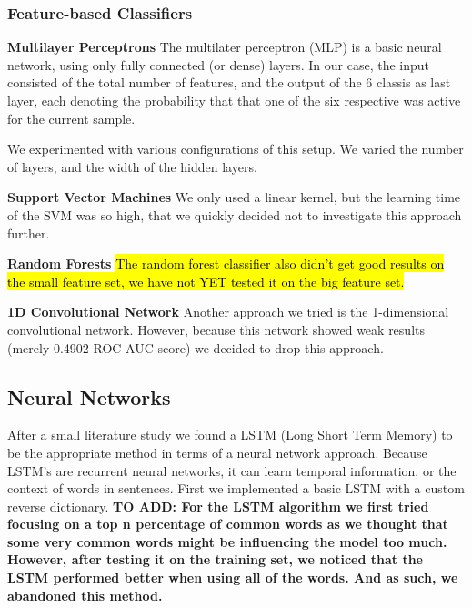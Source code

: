 \documentclass[10pt, a4paper]{article}
\begin{document}
\begin{multicols}{2}
		\subsubsection{Feature-based Classifiers}
		\label{sec:classifiers}
		\textbf{Multilayer Perceptrons}
		The multilater perceptron (MLP) is a basic neural network, using only fully connected (or dense) layers. In our case, the input consisted of the total number of features, and the output of the 6 classis as last layer, each denoting the probability that that one of the six respective was active for the current sample. 
		
		We experimented with various configurations of this setup. We varied the number of layers, and the width of the hidden layers.
		
		
		\textbf{Support Vector Machines}
		We only used a linear kernel, but the learning time of the SVM was so high, that we quickly decided not to investigate this approach further.
		
		\textbf{Random Forests}
		\hl{The random forest classifier also didn't get good results on the small feature set, we have not YET tested it on the big feature set.}
		
		\textbf{1D Convolutional Network}
		Another approach we tried is the 1-dimensional convolutional network. However, because this network showed weak results (merely 0.4902 ROC AUC score) we decided to drop this approach.
		
		\subsection{Neural Networks}
		
		After a small literature study we found a LSTM (Long Short Term Memory) to be the appropriate method in terms of a neural network approach. Because LSTM's are recurrent neural networks, it can learn temporal information, or the context of words in sentences. First we implemented a basic LSTM with a custom reverse dictionary. \textbf{TO ADD: For the LSTM algorithm we first tried focusing on a top n percentage of common words as we thought that some very common words might be influencing the model too much. However, after testing it on the training set, we noticed that the LSTM performed better when using all of the words. And as such, we abandoned this method.}
		

\end{multicols}
\end{document}
